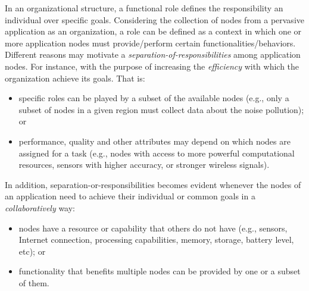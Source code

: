 In an organizational structure, a functional role defines the responsibility an individual over specific goals. 
Considering the collection of nodes from a pervasive application as an organization, a role can be defined as a context in which one or more application nodes must provide/perform certain functionalities/behaviors. Different reasons may motivate a \textit{separation-of-responsibilities} among application nodes.
For instance, with the purpose of increasing the \textit{efficiency} with which the organization achieve its goals. That is:
\begin{itemize}
	\item  specific roles can be played by a subset of the available nodes (e.g., only a subset of nodes in a given region must collect data about the noise pollution); or
	
	\item performance, quality and other attributes may depend on which nodes are assigned for a task (e.g., nodes with access to more powerful computational resources, sensors with higher accuracy, or stronger wireless signals).
\end{itemize}


In addition, separation-or-responsibilities becomes evident whenever the nodes of an application need to achieve their individual or common goals in a \textit{collaboratively} way:

\begin{itemize}
	
	\item nodes have a resource or capability that others do not have (e.g., sensors, Internet connection, processing capabilities, memory, storage, battery level, etc); or
	
	\item functionality that benefits multiple nodes can be provided by one or a subset of them.
	
\end{itemize}

